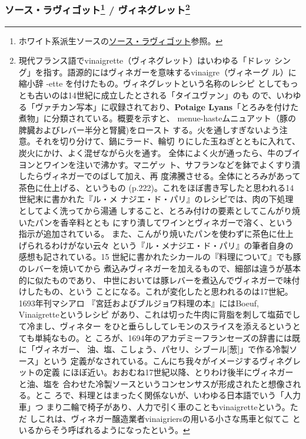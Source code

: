 \begin{recette}
\maeaki

\hypertarget{ux30bdux30fcux30b9ux30e9ux30f4ux30a3ux30b4ux30c3ux30c830-ux30f4ux30a3ux30cdux30b0ux30ecux30c3ux30c831}{%
\subsubsection[ソース・ラヴィゴット /
ヴィネグレット]{\texorpdfstring{ソース・ラヴィゴット\footnote{ホワイト系派生ソースの\protect\hyperlink{sauce-ravigote}{ソース・ラヴィゴット}参照。}
/ ヴィネグレット\footnote{現代フランス語でvinaigrette（ヴィネグレット）はいわゆる「ドレッ
  シング」を指す。語源的にはヴィネガーを意味するvinaigre（ヴィネーグ
  ル）に縮小辞 -ette を付けたもの。ヴィネグレットという名称のレシピ
  としてもっとも古いのは14世紀に成立したとされる「タイユヴァン」のも
  ので、いわゆる「ヴァチカン写本」に収録されており、\textbf{Potaige
  Lyans}「とろみを付けた煮物」に分類されている。概要を示すと、
  menue-hasteムニュアット（豚の脾臓およびレバー半分と腎臓)をロースト
  する。火を通しすぎないよう注意。それを切り分けて、鍋にラード、輪切
  りにした玉ねぎとともに入れて、炭火にかけ、よく混ぜながら火を通す。
  全体によく火が通ったら、牛のブイヨンとワインを注いで沸かす。マニゲッ
  ト、サフランなどを鉢でよくすり潰したらヴィネガーでのばして加え、再
  度沸騰させる。全体にとろみがあって茶色に仕上げる、というもの
  (p.222)。これをほぼ書き写したと思われる14世紀末に書かれた『ル・メ
  ナジエ・ド・パリ』のレシピでは、肉の下処理としてよく洗ってから湯通
  しすること、とろみ付けの要素としてこんがり焼いたパンを香辛料ととも
  にすり潰してワインとヴィネガーで溶く、という指示が追加されている。
  また、こんがり焼いたパンを使わずに茶色に仕上げられるわけがない云々
  という『ル・メナジエ・ド・パリ』の筆者自身の感想も記されている。15
  世紀に書かれたシカールの『料理について』でも豚のレバーを焼いてから
  煮込みヴィネガーを加えるもので、細部は違うが基本的に似たものであり、
  中世においては豚レバーを煮込んでヴィネガーで味付けしたもの、という
  ことになる。これが変化したと思われるのは17世紀。1693年刊マシアロ
  『宮廷およびブルジョワ料理の本』にはBoeuf, Vinaigretteというレシピ
  があり、これは切った牛肉に背脂を刺して塩茹でして冷まし、ヴィネター
  をひと垂らししてレモンのスライスを添えるというとても単純なもの。と
  ころが、1694年のアカデミーフランセーズの辞書には既に「ヴィネガー、
  油、塩、こしょう、パセリ、シブール{[}葱{]}」で作る冷製ソース」という
  定義がなされている。こんにち我々がイメージするヴィネグレットの定義
  にほぼ近い。おおむね17世紀以降、とりわけ後半にヴィネガーと油、塩を
  合わせた冷製ソースというコンセンサスが形成されたと想像される。とこ
  ろで、料理とはまったく関係ないが、いわゆる日本語でいう「人力車」つ
  まり二輪で椅子があり、人力で引く車のこともvinaigretteという。ただ
  しこれは、ヴィネガー醸造業者vinaigriersの用いる小さな馬車と似てこ
  といるからそう呼ばれるようになったという。}}{ソース・ラヴィゴット / ヴィネグレット}}\label{ux30bdux30fcux30b9ux30e9ux30f4ux30a3ux30b4ux30c3ux30c830-ux30f4ux30a3ux30cdux30b0ux30ecux30c3ux30c831}}


\end{recette}
